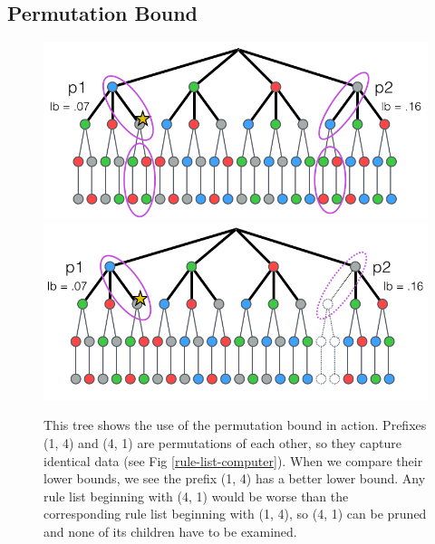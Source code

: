 \subsection{Permutation Bound}
\label{def:perm-bound}

\begin{figure}[t!]
\includegraphics[width=\textwidth]{figs/branch-and-bound-permutations.png}
\includegraphics[width=\textwidth]{figs/branch-and-bound-permutations-pruned.png}
\caption[Permutation bound]{This tree shows the use of the permutation bound in action. 
Prefixes (1, 4) and (4, 1) are permutations of each other, so they capture identical data (see Fig \ref{rule-list-computer}).
When we compare their lower bounds, we see the prefix (1, 4) has a better lower bound.
Any rule list beginning with (4, 1) would be worse than the corresponding rule list beginning with (1, 4), so (4, 1) can be pruned and none of its children have to be examined.
\label{fig:permutation-bound}}
\end{figure}

